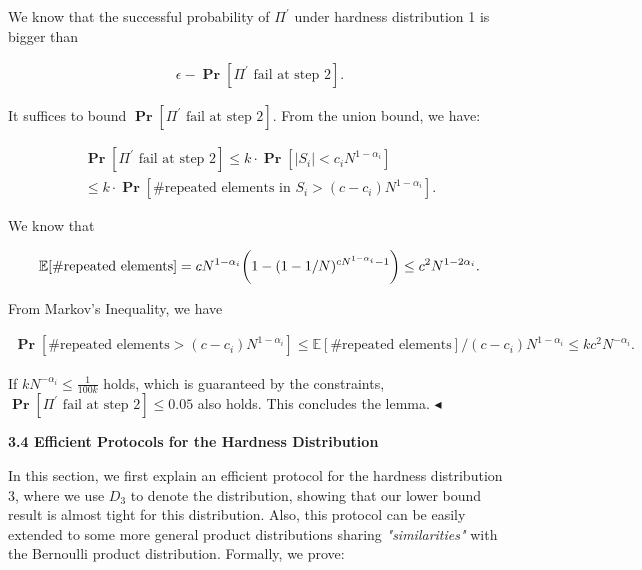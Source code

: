 We know that the successful probability of $\Pi^{\prime}$ under hardness distribution 1 is bigger than\par


\[\begin{gathered}
\epsilon-\operatorname*{\mathbf{Pr}}[\Pi^{\prime}\text{ fail at step 2}].
\end{gathered}\]


It suffices to bound $\operatorname*{\mathbf{Pr}}[\Pi^{\prime}\text{ fail at step 2}]$. From the union bound, we have:\par


\[\begin{gathered}
\displaystyle\operatorname*{\mathbf{Pr}}[\Pi^{\prime}\text{ fail at step 2}] \displaystyle\leq k\cdot\operatorname*{\mathbf{Pr}}[|S_{i}|<c_{i}N^{1-\alpha_{i}}] \\
\displaystyle\leq k\cdot\operatorname*{\mathbf{Pr}}[\#\text{repeated elements in $S_{i}$}>(c-c_{i})N^{1-\alpha_{i}}].
\end{gathered}\]


We know that\par


\[\begin{gathered}
\mathbb{E}[\#\text{repeated elements}]=cN^{1-\alpha_{i}}\bigg{(}1-(1-1/N)^{cN^{1-\alpha_{i}}-1}\bigg{)}\leq c^{2}N^{1-2\alpha_{i}}.
\end{gathered}\]


From Markov’s Inequality, we have\par


\[\begin{gathered}
\operatorname*{\mathbf{Pr}}[\#\text{repeated elements}>(c-c_{i})N^{1-\alpha_{i}}]\leq\mathbb{E}[\#\text{repeated elements}]/(c-c_{i})N^{1-\alpha_{i}}\leq kc^{2}N^{-\alpha_{i}}.
\end{gathered}\]


If $kN^{-\alpha_{i}}\leq\frac{1}{100k}$ holds, which is guaranteed by the constraints, $\operatorname*{\mathbf{Pr}}[\Pi^{\prime}\text{ fail at step 2}]\leq 0.05$ also holds. This concludes the lemma.
$\blacktriangleleft$\par






\par\medskip\noindent\textbf{
3.4 Efficient Protocols for the Hardness Distribution}\par




In this section, we first explain an efficient protocol for the hardness distribution 3, where we use $D_{3}$ to denote the distribution, showing that our lower bound result is almost tight for this distribution. Also, this protocol can be easily extended to some more general product distributions sharing \emph{"similarities"} with the Bernoulli product distribution.
Formally, we prove:\par



